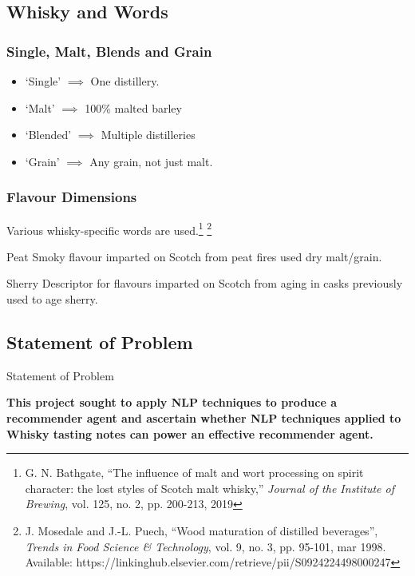 \documentclass{beamer}
\begin{document}
\subsection{Whisky and Words}
\begin{frame}
    \frametitle{Single, Malt, Blends and Grain}
    \begin{itemize}
        \item `Single' $\implies$ One distillery.
        \item `Malt' $\implies$ 100\% malted barley
        \item `Blended' $\implies$ Multiple distilleries
        \item `Grain' $\implies$ Any grain, not just malt.
    \end{itemize}
    
\end{frame}

\begin{frame}
    \frametitle{Flavour Dimensions}
    Various whisky-specific words are used.\footnote{
        G. N. Bathgate, ``The influence of malt and wort processing on spirit character: the lost styles of
    Scotch malt whisky,'' \emph{Journal of the Institute of Brewing}, vol. 125, no. 2, pp. 200-213, 2019}
    \footnote{J. Mosedale and J.-L. Puech, ``Wood maturation of distilled beverages'', \emph{Trends in
    Food Science \& Technology}, vol. 9, no. 3, pp. 95-101, mar 1998. Available:
    https://linkinghub.elsevier.com/retrieve/pii/S0924224498000247}
    
    \begin{block}{Peat}
    Smoky flavour imparted on Scotch from peat fires used dry malt/grain.
    \end{block}

    \begin{block}{Sherry}
    Descriptor for flavours imparted on Scotch from aging in casks previously used to age sherry.
    \end{block}
\end{frame}

\subsection{Statement of Problem}

\begin{frame}{Statement of Problem}

    \textbf{This project sought to apply NLP techniques to produce a recommender agent and ascertain whether
    NLP techniques applied to Whisky tasting notes can power an effective recommender agent.}
\end{frame}
\end{document}
